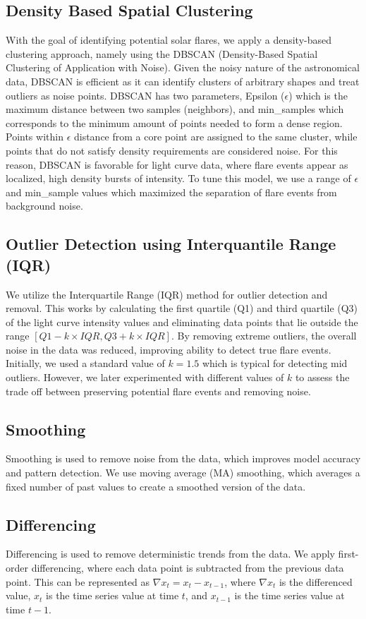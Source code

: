 \documentclass{article}
\begin{document}
\subsection{Density Based Spatial Clustering}
With the goal of identifying potential solar flares, we apply a density-based clustering approach, namely using the DBSCAN (Density-Based Spatial Clustering of Application with Noise). Given the noisy nature of the astronomical data, DBSCAN is efficient as it can identify clusters of arbitrary shapes and treat outliers as noise points. DBSCAN has two parameters, Epsilon ($\epsilon$) which is the maximum distance between two samples (neighbors), and min\_samples which corresponds to the minimum amount of points needed to form a dense region. Points within $\epsilon$ distance from a core point are assigned to the same cluster, while points that do not satisfy density requirements are considered noise. For this reason, DBSCAN is favorable for light curve data, where flare events appear as localized, high density bursts of intensity. To tune this model, we use a range of $\epsilon$ and min\_sample values which maximized the separation of flare events from background noise.

\subsection{Outlier Detection using Interquantile Range (IQR)}
We utilize the Interquartile Range (IQR) method for outlier detection and removal. This works by calculating the first quartile (Q1) and third quartile (Q3) of the light curve intensity values and eliminating data points that lie outside the range $[Q1-k \times IQR, Q3+k \times IQR]$. By removing extreme outliers, the overall noise in the data was reduced, improving ability to detect true flare events. Initially, we used a standard value of $k=1.5$ which is typical for detecting mid outliers. However, we later experimented with different values of $k$ to assess the trade off between preserving potential flare events and removing noise.

\subsection{Smoothing}
Smoothing is used to remove noise from the data, which improves model accuracy and pattern detection. We use moving average (MA) smoothing, which averages a fixed number of past values to create a smoothed version of the data.

\subsection{Differencing}
Differencing is used to remove deterministic trends from the data. We apply first-order differencing, where each data point is subtracted from the previous data point. This can be represented as $\nabla x_t= x_t - x_{t-1}$, where $\nabla x_t$ is the differenced value, $x_t$ is the time series value at time $t$, and $x_{t-1}$ is the time series value at time $t-1$.
\end{document}
